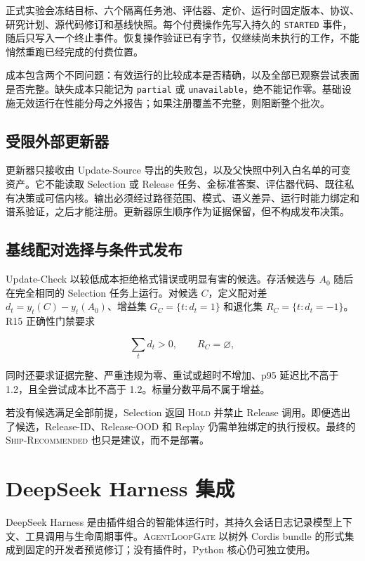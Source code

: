 \documentclass[UTF8,10pt,twocolumn,fontset=none]{ctexart}
\newcommand{\system}{\textsc{AgentLoopGate}\xspace}
\newcommand{\hold}{\textsc{Hold}\xspace}
\newcommand{\ship}{\textsc{Ship-Recommended}\xspace}
\newcommand{\code}[1]{\texttt{#1}}
\begin{document}
正式实验会冻结目标、六个隔离任务池、评估器、定价、运行时固定版本、协议、研究计划、源代码修订和基线快照。每个付费操作先写入持久的 \code{STARTED} 事件，随后只写入一个终止事件。恢复操作验证已有字节，仅继续尚未执行的工作，不能悄然重跑已经完成的付费位置。

成本包含两个不同问题：有效运行的比较成本是否精确，以及全部已观察尝试表面是否完整。缺失成本只能记为 \code{partial} 或 \code{unavailable}，绝不能记作零。基础设施无效运行在性能分母之外报告；如果注册覆盖不完整，则阻断整个批次。

\subsection{受限外部更新器}

更新器只接收由 Update-Source 导出的失败包，以及父快照中列入白名单的可变资产。它不能读取 Selection 或 Release 任务、金标准答案、评估器代码、既往私有决策或可信内核。输出必须经过路径范围、模式、语义差异、运行时能力绑定和谱系验证，之后才能注册。更新器原生顺序作为证据保留，但不构成发布决策。

\subsection{基线配对选择与条件式发布}

Update-Check 以较低成本拒绝格式错误或明显有害的候选。存活候选与 $A_0$ 随后在完全相同的 Selection 任务上运行。对候选 $C$，定义配对差 $d_t=y_t(C)-y_t(A_0)$、增益集 $G_C=\{t:d_t=1\}$ 和退化集 $R_C=\{t:d_t=-1\}$。R15 正确性门禁要求

\begin{equation}
\sum_t d_t > 0, \qquad R_C=\varnothing,
\label{eq:correctness-zh}
\end{equation}

同时还要求证据完整、严重违规为零、重试或超时不增加、p95 延迟比不高于 1.2，且全尝试成本比不高于 1.2。标量分数平局不属于增益。

若没有候选满足全部前提，Selection 返回 \hold 并禁止 Release 调用。即便选出了候选，Release-ID、Release-OOD 和 Replay 仍需单独绑定的执行授权。最终的 \ship 也只是建议，而不是部署。

\section{DeepSeek Harness 集成}

DeepSeek Harness 是由插件组合的智能体运行时，其持久会话日志记录模型上下文、工具调用与生命周期事件\cite{deepseekharness2026}。\system 以树外 Cordis bundle 的形式集成到固定的开发者预览修订；没有插件时，Python 核心仍可独立使用。
\end{document}
